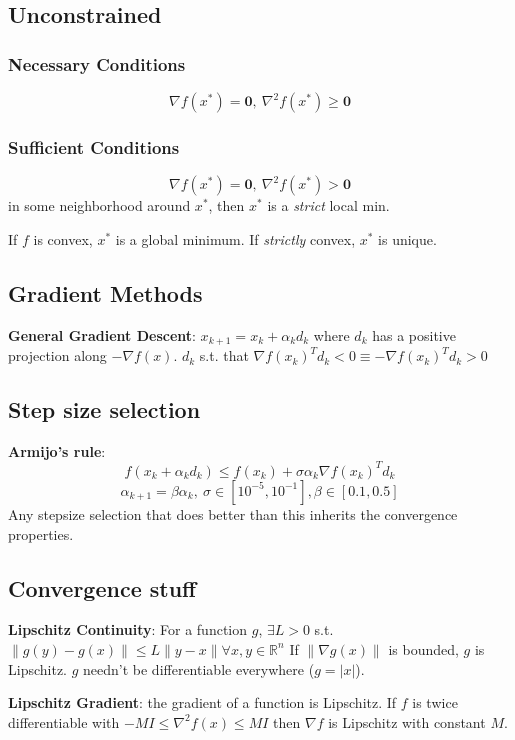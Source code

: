 \documentclass[10pt,landscape]{article}
\begin{document}
\begin{multicols*}{\mycolnums}
    \subsection*{Unconstrained}
    \subsubsection*{Necessary Conditions}
    \[\nabla f(x^*)=\mathbf{0},\ \nabla^2 f(x^*)\geq\mathbf{0}\]
    \subsubsection*{Sufficient Conditions}
    \[\nabla f(x^*)=\mathbf{0},\ \nabla^2 f(x^*)>\mathbf{0}\]
    in some neighborhood around $x^*$, then $x^*$ is a \textit{strict} local min.

    \noindent
    If $f$ is convex, $x^*$ is a global minimum. If \textit{strictly} convex, $x^*$ is unique.

    \subsection*{Gradient Methods}
    \textbf{General Gradient Descent}: $x_{k+1}=x_k+\alpha_kd_k$ where $d_k$ has a positive
    projection along $-\nabla f(x)$.
    $d_k$ s.t. that $\nabla f(x_k)^Td_k < 0 \equiv -\nabla f(x_k)^Td_k > 0$
    \subsection*{Step size selection}
    \textbf{Armijo's rule}:
    \[f(x_k+\alpha_kd_k) \leq f(x_k)+\sigma\alpha_k\nabla f(x_k)^Td_k\]
    \[\alpha_{k+1} = \beta\alpha_k,\ \sigma\in[10^{-5},10^{-1}],\beta\in[0.1,0.5]\]
    Any stepsize selection that does better than this inherits the convergence properties.
    \subsection*{Convergence stuff}
    \textbf{Lipschitz Continuity}: For a function $g$, $\exists L>0$ s.t.
    $\|g(y)-g(x)\|\leq L\|y-x\|\forall x,y\in\mathbb{R}^n$
    If $\|\nabla g(x)\|$ is bounded, $g$ is Lipschitz. $g$ needn't be differentiable
    everywhere ($g=|x|$).

    \noindent
    \textbf{Lipschitz Gradient}: the gradient of a function is Lipschitz. If $f$ is
    twice differentiable with $-MI \leq \nabla^2f(x)\leq MI$ then $\nabla f$ is Lipschitz
    with constant $M$.


\end{multicols*}
\end{document}

